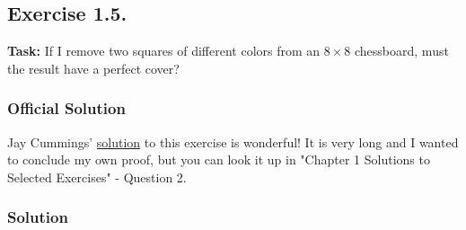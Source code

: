 \documentclass{article}
\begin{document}
\newpage

\subsection{Exercise 1.5.}
\textbf{Task:} If I remove two squares of different colors from an $8 \times 8$ chessboard, must the result have a perfect cover?

\subsubsection*{Official Solution} 
Jay Cummings' \textcolor{blue}{\href{https://longformmath.com/proofs-hints-\%26-solutions}{solution}} to this exercise is wonderful! It is very long and I wanted to conclude my own proof, but you can look it up in "Chapter 1 Solutions to Selected Exercises" - Question 2.

\subsubsection*{Solution}
\end{document}
